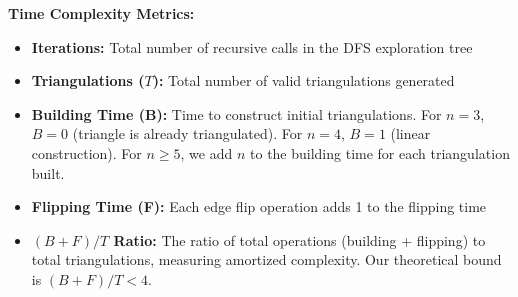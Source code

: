 \documentclass[12pt,a4paper]{article}
\theoremstyle{definition}
\theoremstyle{remark}
\begin{document}
\textbf{Time Complexity Metrics:}
\begin{itemize}
    \item \textbf{Iterations:} Total number of recursive calls in the DFS exploration tree
    \item \textbf{Triangulations ($T$):} Total number of valid triangulations generated
    \item \textbf{Building Time (B):} Time to construct initial triangulations. For $n = 3$, $B = 0$ (triangle is already triangulated). For $n = 4$, $B = 1$ (linear construction). For $n \geq 5$, we add $n$ to the building time for each triangulation built.
    \item \textbf{Flipping Time (F):} Each edge flip operation adds 1 to the flipping time
    \item \textbf{$(B+F)/T$ Ratio:} The ratio of total operations (building + flipping) to total triangulations, measuring amortized complexity. Our theoretical bound is $(B+F)/T < 4$.
\end{itemize}
\end{document}
